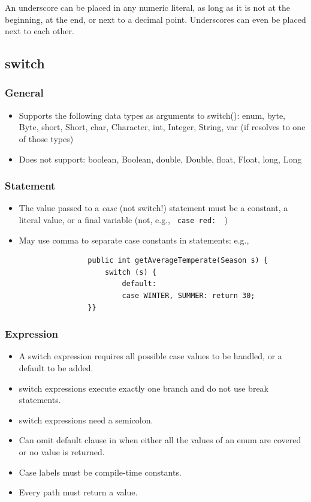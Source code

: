 \documentclass{scrartcl}
\begin{document}
    An underscore can be placed in any numeric literal, as long as it is not at the beginning, at the end, or next to a decimal point. Underscores can even be placed next to each other.

\subsection{switch}

\subsubsection{General}

        \begin{itemize}
            \item Supports the following data types as arguments to switch(): enum, byte, Byte, short, Short, char, Character, int, Integer,
            String, var (if resolves to one of those types)
            \item Does not support: boolean, Boolean, double, Double, float, Float, long, Long
         \end{itemize}

\subsubsection{Statement}

    \begin{itemize}
        \item The value passed to a \textit{case} (not switch!) statement must be a constant, a literal value, or a final variable (not, e.g., \lstinline$ case red:  $)
        \item May use comma to separate case constants in statements: e.g.,
            \begin{lstlisting}
                public int getAverageTemperate(Season s) {
                    switch (s) {
                        default:
                        case WINTER, SUMMER: return 30;
                }}
            \end{lstlisting}
    \end{itemize}

\subsubsection{Expression}

    \begin{itemize}
        \item A switch expression requires all possible case values to be handled, or a default to be added.
        \item switch expressions execute exactly one branch and do not use break statements.
        \item switch expressions need a semicolon.
        \item Can omit default clause in when either all the values of an enum are covered or no value is returned.
        \item Case labels must be compile-time constants.
        \item Every path must return a value.
    \end{itemize}
\end{document}
